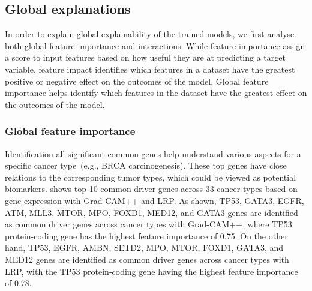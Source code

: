 \subsection{Global explanations}
In order to explain global explainability of the trained models, we first analyse both global feature importance and interactions. While feature importance assign a score to input features based on how useful they are at predicting a target variable, feature impact identifies which features in a dataset have the greatest positive or negative effect on the outcomes of the model. Global feature importance helps identify which features in the dataset have the greatest effect on the outcomes of the model. %

\subsubsection{Global feature importance}
Identification all significant common genes help understand various aspects for a specific cancer type~(e.g., BRCA carcinogenesis). These top genes have close relations to the corresponding tumor types, which could be viewed as potential biomarkers.  shows top-10 common driver genes across 33 cancer types based on gene expression with Grad-CAM++ and LRP. As shown, TP53, GATA3, EGFR, ATM, MLL3, MTOR, MPO, FOXD1, MED12, and GATA3 genes are identified as common driver genes across cancer types with Grad-CAM++, where TP53 protein-coding gene has the highest feature importance of 0.75. On the other hand, TP53, EGFR, AMBN, SETD2, MPO, MTOR, FOXD1, GATA3, and MED12 genes are identified as common driver genes across cancer types with LRP, with the TP53 protein-coding gene having the highest feature importance of 0.78. 

